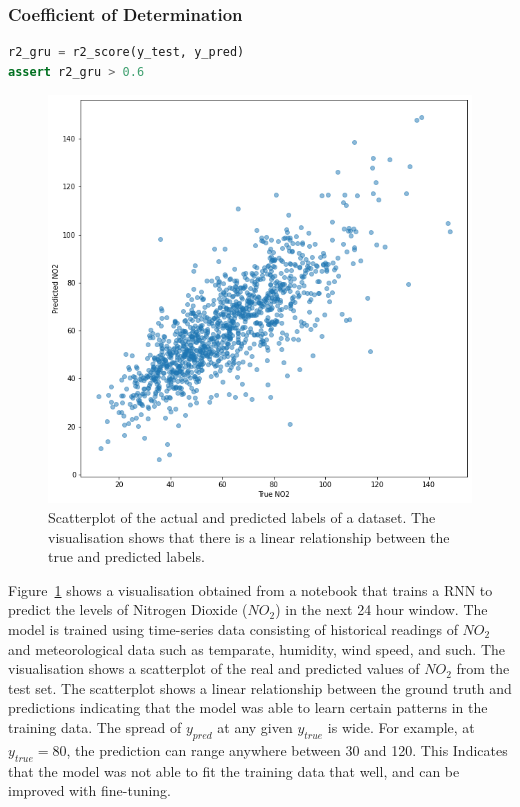 \documentclass[conference]{IEEEtran}
\begin{document}
\subsubsection{Coefficient of Determination}\label{sec:r2}

\begin{lstlisting}[language=Python, caption={Assertion to check that the Coefficient of Determination ($R^2$) is higer than the specified threshold.}, label={lst:r2}]
r2_gru = r2_score(y_test, y_pred)
assert r2_gru > 0.6
\end{lstlisting}

\begin{figure}
  \includegraphics[width=\linewidth]{../catalogue/select-332a.png}
  \caption{Scatterplot of the actual and predicted labels of a dataset. The visualisation shows that there is a linear relationship between the true and predicted labels.}\label{fig:r2}
\end{figure}

Figure~\ref{fig:r2} shows a visualisation obtained from a notebook that trains a RNN to predict the levels of Nitrogen Dioxide ($NO_2$) in the next 24 hour window. The model is trained using time-series data consisting of historical readings of $NO_2$ and meteorological data such as temparate, humidity, wind speed, and such. The visualisation shows a scatterplot of the real and predicted values of $NO_2$ from the test set. The scatterplot shows a linear relationship between the ground truth and predictions indicating that the model was able to learn certain patterns in the training data. The spread of $y_{pred}$ at any given $y_{true}$ is wide. For example, at $y_{true} = 80$, the prediction can range anywhere between 30 and 120. This Indicates that the model was not able to fit the training data that well, and can be improved with fine-tuning.
\end{document}
